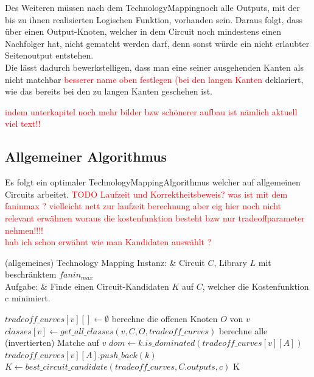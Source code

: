 \documentclass[11pt, a4paper, german]{article}
\newcommand{\TM}{TechnologyMapping}
\begin{document}
 Des Weiteren müssen nach dem \TM noch alle Outputs, mit der bis zu ihnen realisierten Logischen Funktion, vorhanden sein. Daraus folgt, dass über einen Output-Knoten, welcher in dem Circuit noch mindestens einen Nachfolger hat, nicht gematcht werden darf, denn sonst würde ein nicht erlaubter Seitenoutput entstehen.\\
 Die lässt dadurch bewerkstelligen, dass man eine seiner ausgehenden Kanten als nicht matchbar \textcolor{red}{besserer name oben festlegen (bei den langen Kanten} deklariert, wie das bereits bei den zu langen Kanten geschehen ist. 

 \textcolor{red}{ indem unterkapitel noch mehr bilder bzw schönerer aufbau ist nämlich aktuell viel text!!}
 
 \subsection{Allgemeiner Algorithmus}
 \label{subsec:allg_algorithmus}
 Es folgt ein optimaler  \TM Algorithmus welcher auf allgemeinen Circuits arbeitet. 
 \textcolor{red}{TODO Laufzeit  und Korrektheitsbeweis? was ist mit dem faninmax ? vielleicht nett zur laufzeit berechnung aber eig hier noch nicht relevant   erwähnen woraus die kostenfunktion besteht bzw nur tradeoffparameter nehmen!!!!}\\
 \textcolor{red}{hab ich schon erwähnt wie man Kandidaten auswählt ?}
 
 \begin{problem}[framed]{(allgemeines) Technology Mapping}
  Instanz:  & Circuit $C$, Library $L$ mit beschr\"anktem $fanin_{max}$\\
  Aufgabe: &  Finde einen Circuit-Kandidaten $K$ auf $C$, welcher die Kostenfunktion c minimiert.
\end{problem}

\begin{algorithm}[H]
 \LinesNumbered
 \DontPrintSemicolon
 \caption{(allgemeines) \TM}
 {
 	$tradeoff\_curves[v][] \gets \emptyset$ \;
 	berechne die offenen Knoten $O$ von $v$\; 
 	$classes[v] \gets get\_all\_classes(v,C,  O, tradeoff\_curves)$\;
 	berechne alle (invertierten) Matche auf $v$\;
  	 {
   		{
   				{
   					$ dom \gets k.is\_dominated(tradeoff\_curves[v][A])$\;
						{$tradeoff\_curves[v][A].push\_back(k)$}
   				}
   		}
   	}
 }
 $K \gets best\_circuit\_candidate(tradeoff\_curves, C.outputs, c)$\;
\Return K
\end{algorithm}\ \\
 
\end{document}
